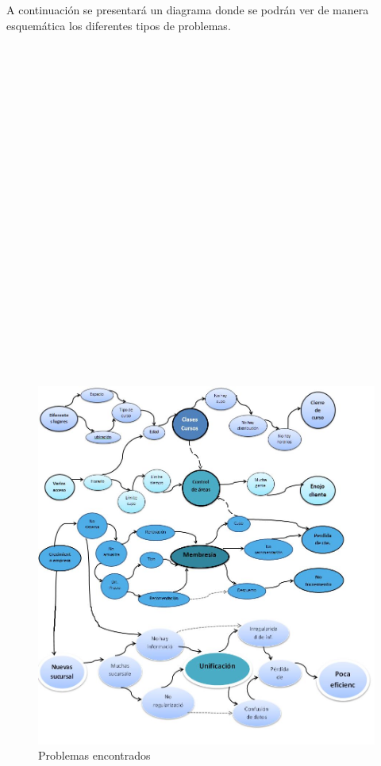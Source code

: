 \documentclass[12pt,letterpaper]{article}
\begin{document}
A continuación se presentará un diagrama donde se podrán ver de manera esquemática los diferentes tipos de problemas.\\ \\ \\ \\ \\ \\ \\ \\ \\ \\ \\ \\ \\ \\ \\ \\ \\ \\ \\ \\ \\ \\ \\

\begin{figure}
   \centering
   \includegraphics[scale=0.50]{problemas.png}
   \caption{Problemas encontrados}
   \label{fig:my_label}
\end{figure}
\end{document}
